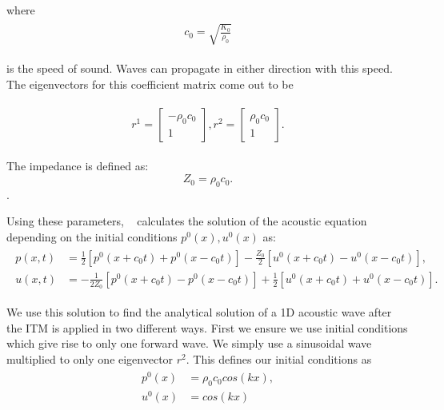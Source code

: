 where 
\begin{align}
    \begin{split}
        c_0 = \sqrt{\frac{K_0}{\rho_0}}
    \end{split}
\end{align}

is the speed of sound. Waves can propagate in either direction with this speed. The eigenvectors for this coefficient matrix come out to be

\begin{align}
    \begin{split}
        r^1 = \begin{bmatrix}
            -\rho_0 c_0 \\
            1
        \end{bmatrix}, 
        r^2 = \begin{bmatrix}
            \rho_0 c_0 \\
            1
        \end{bmatrix}.
    \end{split}
\end{align}

The impedance is defined as:
\begin{equation}
    Z_0 = \rho_0 c_0.
\end{equation}.

Using these parameters, ~\parencite[Sec. 2.8]{leveque_2002} calculates the solution of the acoustic equation depending on the initial conditions $p^0(x), u^0(x)$ as:
\begin{align}
    \begin{split}
        p(x,t) &= \frac{1}{2}\left[p^0\left(x + c_0t\right) + p^0\left(x - c_0t\right)\right] - \frac{Z_0}{2}\left[u^0\left(x+c_0t\right) - u^0\left(x-c_0t\right)\right], \\
        u(x,t) &= -\frac{1}{2Z_0}\left[p^0\left(x+c_0t\right) - p^0\left(x-c_0t\right)\right] + \frac{1}{2}\left[u^0\left(x+c_0t\right) + u^0\left(x-c_0t\right)\right] .
    \end{split}
    \label{eq:solutionacoustic}
\end{align}

We use this solution to find the analytical solution of a 1D acoustic wave after the \ac{ITM} is applied in two different ways. First we ensure we use initial conditions which give rise to only one forward wave. We simply use a sinusoidal wave multiplied to only one eigenvector $r^2$.
This defines our initial conditions as
\begin{align}
    \begin{split}
        p^0\left(x\right) &= \rho_0c_0cos\left(kx\right), \\
        u^0\left(x\right) &= cos\left(kx\right)
    \end{split}
    \label{eq:initialconditions}
\end{align}

